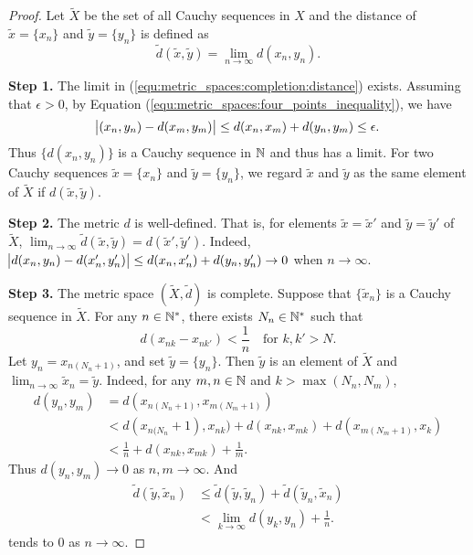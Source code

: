 \begin{proof}
Let $\tilde{X}$ be the set of all Cauchy sequences in $X$ and the distance 
of $\tilde{x} = \{x_n\}$ and $\tilde{y} = \{y_n\}$ is defined as 
\begin{equation}
    \label{equ:metric_spaces:completion:distance}
    \tilde{d}(\tilde{x}, \tilde{y}) = \lim_{n \to \infty} d(x_n, y_n). 
\end{equation}

\textbf{Step 1.} 
The limit in (\ref{equ:metric_spaces:completion:distance}) exists. 
Assuming that $\epsilon > 0$, by Equation 
(\ref{equ:metric_spaces:four_points_inequality}), we have 
\begin{equation*}
    \abs{(x_n, y_n) - d(x_m, y_m)} \le d(x_n, x_m) + d(y_n, y_m) 
    \le \epsilon. 
\end{equation*}
Thus $\{d(x_n, y_n)\}$ is a Cauchy sequence in $\mathbb{N}$ and thus has a limit. 
For two Cauchy sequences $\tilde{x} = \{x_n\}$ and $\tilde{y} = \{y_n\}$, 
we regard $\tilde{x}$ and $\tilde{y}$ as the same element of $\tilde{X}$ if 
$d(\tilde{x}, \tilde{y})$. 

\textbf{Step 2.}
The metric $d$ is well-defined. 
That is, for elements $\tilde{x} = \tilde{x}'$ and $\tilde{y} = \tilde{y}'$ 
of $\tilde{X}$, $\lim_{n \to \infty} \tilde{d}(\tilde{x}, \tilde{y}) = 
d(\tilde{x}', \tilde{y}')$. 
Indeed, $\abs{d(x_n, y_n) - d(x_n', y_n')} \le d(x_n, x_n') + d(y_n, y_n') 
\to 0$ when $n \to \infty$.

\textbf{Step 3.}
The metric space $(\tilde{X}, \tilde{d})$ is complete. 
Suppose that $\{\tilde{x}_n\}$ is a Cauchy sequence in $\tilde{X}$. 
For any $n \in \mathbb{N}^\ast$, there exists $N_n \in \mathbb{N}^\ast$ such that 
\begin{equation*}
    d(x_{nk} - x_{nk'}) < \frac{1}{n} \quad \text{for } k, k' > N. 
\end{equation*}
Let $y_n = x_{n(N_n+1)}$, and set $\tilde{y} = \{y_n\}$. 
Then $\tilde{y}$ is an element of $\tilde{X}$ and $\lim_{n \to \infty} 
\tilde{x}_n = \tilde{y}$. 
Indeed, for any $m, n \in \mathbb{N}$ and $k > \max(N_n, N_m)$, 
\begin{equation*}
    \begin{aligned}
        d(y_n, y_m) &= d(x_{n(N_n + 1)}, x_{m(N_m + 1)}) \\
        &< d(x_{n(N_n} + 1), x_{nk}) + d(x_{nk}, x_{mk}) 
        +  d(x_{m(N_m + 1)}, x_k) \\
        &< \frac{1}{n} + d(x_{nk}, x_{mk}) + \frac{1}{m}.
    \end{aligned}
\end{equation*}
Thus $d(y_n, y_m) \to 0$ as $n, m \to \infty$. 
And 
\begin{equation*}
    \begin{aligned}
        \tilde{d}(\tilde{y}, \tilde{x}_n) 
        & \le \tilde{d}(\tilde{y}, \tilde{y}_n) 
        + \tilde{d}(\tilde{y}_n, \tilde{x}_n) \\
        &< \lim_{k \to \infty} d(y_k, y_n)+ \frac{1}{n}. 
    \end{aligned}
\end{equation*}
tends to $0$ as $n \to \infty$. 


\end{proof}
